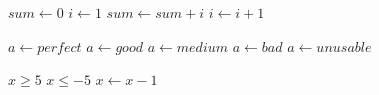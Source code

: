 \documentclass{article}
\begin{document}
\begin{algorithmic}[1]
  \State $sum\gets 0$
  \State $i\gets 1$
    \State $sum\gets sum+i$
    \State $i\gets i+1$
  \EndWhile
\end{algorithmic}

\begin{algorithmic}[1]
    \State $a\gets perfect$
    \State $a\gets good$
    \State $a\gets medium$
    \State $a\gets bad$
  \Else
    \State $a\gets unusable$
  \EndIf
\end{algorithmic}

\begin{algorithmic}[1]
  \Require $x\ge5$
  \Ensure $x\le-5$
  \Statex
    \State $x\gets x-1$
  \EndWhile
\end{algorithmic}
\end{document}
